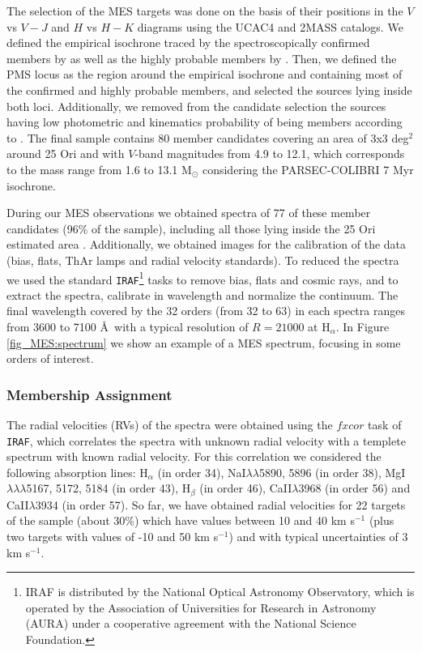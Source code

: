 \documentclass[12pt]{article}
\newcounter{subsubsubsection}[subsubsection]
\begin{document}
\label{sec_echelle:targets}
The selection of the MES targets was done on the basis of their positions in the $V$ vs $V-J$ and $H$ vs $H-K$ diagrams using the UCAC4 and 2MASS catalogs. We defined the empirical isochrone traced by the spectroscopically confirmed members by \citet{Briceno2005,Briceno2007,Downes2014} as well as the highly probable members by \citet{Kharchenko2005}. Then, we defined the PMS locus as the region around the empirical isochrone and containing most of the confirmed and highly probable members, and selected the sources lying inside both loci. Additionally, we removed from the candidate selection the sources having low photometric and kinematics probability of being members according to \citet{Kharchenko2005}. The final sample contains 80 member candidates covering an area of 3x3 deg$^2$ around 25 Ori and with $V$-band magnitudes from 4.9 to 12.1, which corresponds to the mass range from 1.6 to 13.1 M$_\odot$ considering the PARSEC-COLIBRI 7 Myr isochrone.

\label{sec_echelle:reduction}
During our MES observations we obtained spectra of 77 of these member candidates (96\% of the sample), including all those lying inside the 25 Ori estimated area \citep[1.0$^\circ$ radius; ][]{Briceno2005,Briceno2007}. Additionally, we obtained images for the calibration of the data (bias, flats, ThAr lamps and radial velocity standards). To reduced the spectra we used the standard \texttt{IRAF}\footnote{IRAF is distributed by the National Optical Astronomy Observatory, which is operated by the Association of Universities for Research in Astronomy (AURA) under a cooperative agreement with the National Science Foundation.} tasks to remove bias, flats and cosmic rays, and to extract the spectra, calibrate in wavelength and normalize the continuum. The final wavelength covered by the 32 orders (from 32 to 63) in each spectra ranges from 3600 to 7100 \AA\ with a typical resolution of $R=21000$ at H$_\alpha$. In Figure \ref{fig_MES:spectrum} we show an example of a MES spectrum, focusing in some orders of interest.

\subsubsection{Membership Assignment}
\label{sec_MES:membership}
The radial velocities (RVs) of the spectra were obtained using the $fxcor$ task of \texttt{IRAF}, which correlates the spectra with unknown radial velocity with a templete spectrum with known radial velocity. For this correlation we considered the following absorption lines: H$_\alpha$ (in order 34), NaI$\lambda\lambda$5890, 5896 (in order 38), MgI$\lambda\lambda\lambda$5167, 5172, 5184 (in order 43), H$_\beta$ (in order 46), CaII$\lambda$3968 (in order 56) and CaII$\lambda$3934 (in order 57). So far, we have obtained radial velocities for 22 targets of the sample (about 30\%) which have values between 10 and 40 km s$^{-1}$ (plus two targets with values of -10 and 50 km s$^{-1}$) and with typical uncertainties of 3 km s$^{-1}$. 
\end{document}
